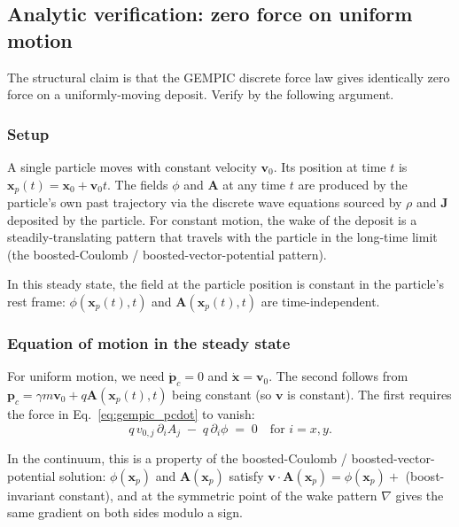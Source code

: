 \documentclass[11pt,a4paper]{article}
\newcommand{\vv}[1]{\mathbf{#1}}
\begin{document}
\subsection{Analytic verification: zero force on uniform motion}

The structural claim is that the GEMPIC discrete force law gives
identically zero force on a uniformly-moving deposit.  Verify by
the following argument.

\subsubsection*{Setup}

A single particle moves with constant velocity $\vv{v}_0$.  Its
position at time $t$ is $\vv{x}_p(t) = \vv{x}_0 + \vv{v}_0 t$.
The fields $\phi$ and $\vv{A}$ at any time $t$ are produced by the
particle's own past trajectory via the discrete wave equations
sourced by $\rho$ and $\vv{J}$ deposited by the particle.  For
constant motion, the wake of the deposit is a steadily-translating
pattern that travels with the particle in the long-time limit
(the boosted-Coulomb / boosted-vector-potential pattern).

In this steady state, the field at the particle position is
constant in the particle's rest frame: $\phi(\vv{x}_p(t), t)$ and
$\vv{A}(\vv{x}_p(t), t)$ are time-independent.

\subsubsection*{Equation of motion in the steady state}

For uniform motion, we need
$\dot{\vv{p}}_c = 0$ and $\dot{\vv{x}} = \vv{v}_0$.
The second follows from $\vv{p}_c = \gamma m \vv{v}_0 +
q\vv{A}(\vv{x}_p(t), t)$ being constant (so $\vv{v}$ is constant).
The first requires the force in Eq.~\eqref{eq:gempic_pcdot} to
vanish:
\begin{equation}
\label{eq:gempic_zero_force_condition}
q\, v_{0,j}\,\partial_i A_j \;-\; q\,\partial_i \phi \;=\; 0
\quad\text{for } i = x, y.
\end{equation}

In the continuum, this is a property of the boosted-Coulomb /
boosted-vector-potential solution: $\phi(\vv{x}_p)$ and
$\vv{A}(\vv{x}_p)$ satisfy
$\vv{v}\cdot\vv{A}(\vv{x}_p) = \phi(\vv{x}_p) +$ (boost-invariant
constant), and at the symmetric point of the wake pattern $\nabla$
gives the same gradient on both sides modulo a sign.
\end{document}
